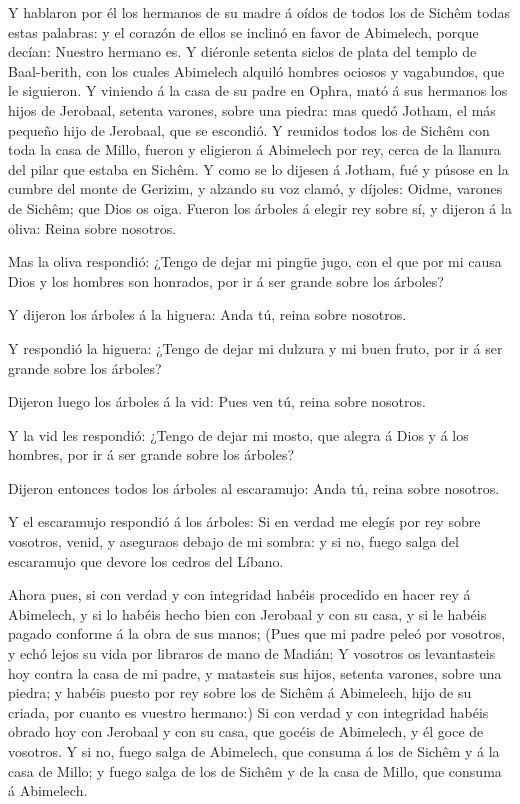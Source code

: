  Y hablaron por él los hermanos de su madre á oídos de todos
los de Sichêm todas estas palabras: y el corazón de ellos se inclinó en
favor de Abimelech, porque decían: Nuestro hermano es.  Y
diéronle setenta siclos de plata del templo de Baal-berith, con los
cuales Abimelech alquiló hombres ociosos y vagabundos, que le siguieron.
 Y viniendo á la casa de su padre en Ophra, mató á sus
hermanos los hijos de Jerobaal, setenta varones, sobre una piedra: mas
quedó Jotham, el más pequeño hijo de Jerobaal, que se escondió.
 Y reunidos todos los de Sichêm con toda la casa de Millo,
fueron y eligieron á Abimelech por rey, cerca de la llanura del pilar
que estaba en Sichêm.  Y como se lo dijesen á Jotham, fué y
púsose en la cumbre del monte de Gerizim, y alzando su voz clamó, y
díjoles: Oidme, varones de Sichêm; que Dios os oiga.  Fueron
los árboles á elegir rey sobre sí, y dijeron á la oliva: Reina sobre
nosotros.

 Mas la oliva respondió: ¿Tengo de dejar mi pingüe jugo, con
el que por mi causa Dios y los hombres son honrados, por ir á ser grande
sobre los árboles?

 Y dijeron los árboles á la higuera: Anda tú, reina sobre
nosotros.

 Y respondió la higuera: ¿Tengo de dejar mi dulzura y mi
buen fruto, por ir á ser grande sobre los árboles?

 Dijeron luego los árboles á la vid: Pues ven tú, reina
sobre nosotros.

 Y la vid les respondió: ¿Tengo de dejar mi mosto, que
alegra á Dios y á los hombres, por ir á ser grande sobre los árboles?

 Dijeron entonces todos los árboles al escaramujo: Anda tú,
reina sobre nosotros.

 Y el escaramujo respondió á los árboles: Si en verdad me
elegís por rey sobre vosotros, venid, y aseguraos debajo de mi sombra: y
si no, fuego salga del escaramujo que devore los cedros del Líbano.

 Ahora pues, si con verdad y con integridad habéis
procedido en hacer rey á Abimelech, y si lo habéis hecho bien con
Jerobaal y con su casa, y si le habéis pagado conforme á la obra de sus
manos;  (Pues que mi padre peleó por vosotros, y echó lejos
su vida por libraros de mano de Madián;  Y vosotros os
levantasteis hoy contra la casa de mi padre, y matasteis sus hijos,
setenta varones, sobre una piedra; y habéis puesto por rey sobre los de
Sichêm á Abimelech, hijo de su criada, por cuanto es vuestro hermano:)
 Si con verdad y con integridad habéis obrado hoy con
Jerobaal y con su casa, que gocéis de Abimelech, y él goce de vosotros.
 Y si no, fuego salga de Abimelech, que consuma á los de
Sichêm y á la casa de Millo; y fuego salga de los de Sichêm y de la casa
de Millo, que consuma á Abimelech.

